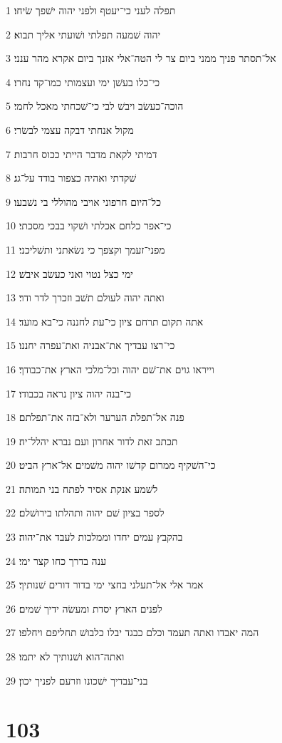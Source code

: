 \par 1 תפלה לעני כי־יעטף ולפני יהוה ישׁפך שׂיחו׃
\par 2 יהוה שׁמעה תפלתי ושׁועתי אליך תבוא׃
\par 3 אל־תסתר פניך ממני ביום צר לי הטה־אלי אזנך ביום אקרא מהר ענני׃
\par 4 כי־כלו בעשׁן ימי ועצמותי כמו־קד נחרו׃
\par 5 הוכה־כעשׂב ויבשׁ לבי כי־שׁכחתי מאכל לחמי׃
\par 6 מקול אנחתי דבקה עצמי לבשׂרי׃
\par 7 דמיתי לקאת מדבר הייתי ככוס חרבות׃
\par 8 שׁקדתי ואהיה כצפור בודד על־גג׃
\par 9 כל־היום חרפוני אויבי מהוללי בי נשׁבעו׃
\par 10 כי־אפר כלחם אכלתי ושׁקוי בבכי מסכתי׃
\par 11 מפני־זעמך וקצפך כי נשׂאתני ותשׁליכני׃
\par 12 ימי כצל נטוי ואני כעשׂב איבשׁ׃
\par 13 ואתה יהוה לעולם תשׁב וזכרך לדר ודר׃
\par 14 אתה תקום תרחם ציון כי־עת לחננה כי־בא מועד׃
\par 15 כי־רצו עבדיך את־אבניה ואת־עפרה יחננו׃
\par 16 וייראו גוים את־שׁם יהוה וכל־מלכי הארץ את־כבודך׃
\par 17 כי־בנה יהוה ציון נראה בכבודו׃
\par 18 פנה אל־תפלת הערער ולא־בזה את־תפלתם׃
\par 19 תכתב זאת לדור אחרון ועם נברא יהלל־יה׃
\par 20 כי־השׁקיף ממרום קדשׁו יהוה משׁמים אל־ארץ הביט׃
\par 21 לשׁמע אנקת אסיר לפתח בני תמותה׃
\par 22 לספר בציון שׁם יהוה ותהלתו בירושׁלם׃
\par 23 בהקבץ עמים יחדו וממלכות לעבד את־יהוה׃
\par 24 ענה בדרך כחו קצר ימי׃
\par 25 אמר אלי אל־תעלני בחצי ימי בדור דורים שׁנותיך׃
\par 26 לפנים הארץ יסדת ומעשׂה ידיך שׁמים׃
\par 27 המה יאבדו ואתה תעמד וכלם כבגד יבלו כלבושׁ תחליפם ויחלפו׃
\par 28 ואתה־הוא ושׁנותיך לא יתמו׃
\par 29 בני־עבדיך ישׁכונו וזרעם לפניך יכון׃

\chapter{103}

